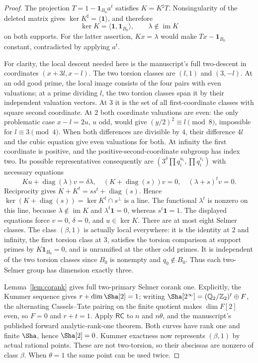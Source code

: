 \begin{proof}
The projection $T=1-\mathbf1_{B_0}a^t$ satisfies $K=K^\sharp T$.
Nonsingularity of the deleted matrix gives
$\ker K^\sharp=\langle\mathbf1\rangle$, and therefore
\[
 \ker K=\langle\mathbf1,\mathbf1_{B_0}\rangle,
 \qquad \lambda\notin\operatorname{im}K
\]
on both supports. For the latter assertion, $Kx=\lambda$ would
make $Tx-\mathbf1_{B_0}$ constant, contradicted by applying $a^t$.

For clarity, the local descent needed here is the manuscript's full
two-descent in coordinates $(x+3l,x-l)$. The two torsion classes are
$(l,1)$ and $(3,-l)$. At an odd good prime, the local image consists
of the four pairs with even valuations; at a prime dividing $l$,
the two torsion classes span it by their independent valuation
vectors. At $3$ it is the set of all first-coordinate classes with
square second coordinate. At $2$ both coordinate valuations are
even: the only problematic case $x-l=2u$, $u$ odd, would give
$(y/2)^2\equiv l\pmod8$, impossible for $l\equiv3\pmod4$.
When both differences are divisible by $4$, their difference $4l$
and the cubic equation give even valuations for both. At infinity
the first coordinate is positive, and the positive-second-coordinate
subgroup has index two. Its possible representatives consequently are
$(3^\delta\prod q_i^{u_i},\prod q_i^{v_i})$ with necessary equations
\[
 Ku+\operatorname{diag}(\lambda)v=\delta\lambda,
 \quad (K+\operatorname{diag}(s))v=0,
 \quad (\lambda+s)^tv=0.
\]
Reciprocity gives $K+K^t=ss^t+\operatorname{diag}(s)$.
Hence $\ker(K+\operatorname{diag}(s))=\ker K^t\cap s^\perp$
is a line. The functional $\lambda^t$ is nonzero on this line,
because $\lambda\notin\operatorname{im}K$ and
$\lambda^t\mathbf1=0$, whereas $s^t\mathbf1=1$.
The displayed equations force $v=0$, $\delta=0$, and $u\in\ker K$.
There are at most eight Selmer classes.
The class $(\beta,1)$ is actually local everywhere: it is the identity
at $2$ and infinity, the first torsion class at $3$, satisfies the
torsion comparison at support primes by $K\mathbf1_{B_0}=0$, and
is unramified at the other odd primes. It is independent of the two
torsion classes since $B_0$ is nonempty and $q_0\notin B_0$.
Thus each two-Selmer group has dimension exactly three.

Lemma~\ref{lem:corank} gives full two-primary Selmer
corank one. Explicitly, the Kummer sequence gives
$r+\dim\Sha[2]=1$; writing
$\Sha[2^\infty]=(\mathbb Q_2/\mathbb Z_2)^t\oplus F$, the
alternating Cassels--Tate pairing on the finite quotient makes
$\dim F[2]$ even, so $F=0$ and $r+t=1$.
Apply $\mathsf{RC}$ to $n$ and $n\theta$, and the manuscript's
published forward analytic-rank-one theorem. Both curves have rank
one and finite $\Sha$, hence $\Sha[2]=0$. Kummer exactness now
represents $(\beta,1)$ by actual rational points. These are not
two-torsion, so their abscissas are nonzero of class $\beta$.
When $\theta=1$ the same point can be used twice.
\end{proof}

